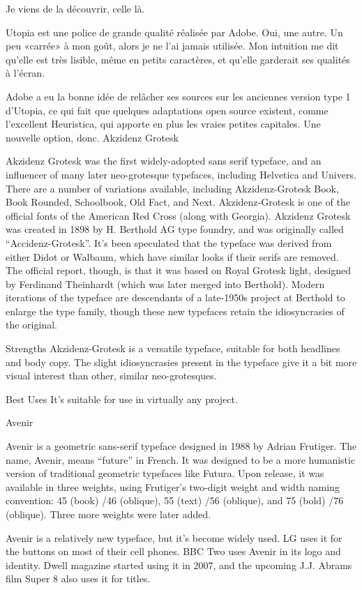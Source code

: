 \documentclass[12pt,a4paper,twocolumn]{book} %
\begin{document}
Je viens de la découvrir, celle là.

Utopia est une police de grande qualité réalisée par Adobe. Oui, une autre. Un peu «carrée» à mon goût, alors je ne l’ai jamais utilisée. Mon intuition me dit qu’elle est très lisible, même en petits caractères, et qu’elle garderait ses qualités à l’écran.

Adobe a eu la bonne idée de relâcher ses sources sur les anciennes version type 1 d’Utopia, ce qui fait que quelques adaptations open source existent, comme l’excellent Heuristica, qui apporte en plus les vraies petites capitales. Une nouvelle option, donc.
Akzidenz Grotesk

Akzidenz Grotesk was the first widely-adopted sans serif typeface, and an influencer of many later neo-grotesque typefaces, including Helvetica and Univers. There are a number of variations available, including Akzidenz-Grotesk Book, Book Rounded, Schoolbook, Old Fact, and Next. Akzidenz-Grotesk is one of the official fonts of the American Red Cross (along with Georgia).
Akzidenz Grotesk was created in 1898 by H. Berthold AG type foundry, and was originally called “Accidenz-Grotesk”. It’s been speculated that the typeface was derived from either Didot or Walbaum, which have similar looks if their serifs are removed. The official report, though, is that it was based on Royal Grotesk light, designed by Ferdinand Theinhardt (which was later merged into Berthold). Modern iterations of the typeface are descendants of a late-1950s project at Berthold to enlarge the type family, though these new typefaces retain the idiosyncrasies of the original.

Strengths
Akzidenz-Grotesk is a versatile typeface, suitable for both headlines and body copy. The slight idiosyncrasies present in the typeface give it a bit more visual interest than other, similar neo-grotesques.

Best Uses
It’s suitable for use in virtually any project.


Avenir

Avenir is a geometric sans-serif typeface designed in 1988 by Adrian Frutiger. The name, Avenir, means “future” in French. It was designed to be a more humanistic version of traditional geometric typefaces like Futura. Upon release, it was available in three weights, using Frutiger’s two-digit weight and width naming convention: 45 (book) /46 (oblique), 55 (text) /56 (oblique), and 75 (bold) /76 (oblique). Three more weights were later added.

Avenir is a relatively new typeface, but it’s become widely used. LG uses it for the buttons on most of their cell phones. BBC Two uses Avenir in its logo and identity. Dwell magazine started using it in 2007, and the upcoming J.J. Abrams film Super 8 also uses it for titles.
\end{document}
